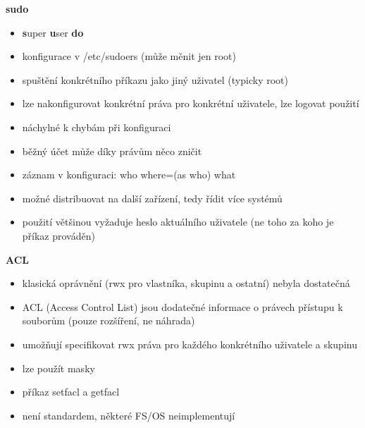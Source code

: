 \textbf{sudo}
\begin{itemize}
	\item \textbf{s}uper \textbf{u}ser \textbf{do}
	\item konfigurace v /etc/sudoers (může měnit jen root)
	\item spuštění konkrétního příkazu jako jiný uživatel (typicky root)
	\item lze nakonfigurovat konkrétní práva pro konkrétní uživatele, lze logovat použití
	\item náchylné k chybám při konfiguraci
	\item běžný účet může díky právům něco zničit
	\item záznam v konfiguraci: who where=(as who) what
	\item možné distribuovat na další zařízení, tedy řídit více systémů
	\item použití většinou vyžaduje heslo aktuálního uživatele (ne toho za koho je příkaz prováděn)
\end{itemize}

\textbf{ACL}
\begin{itemize}
	\item klasická oprávnění (rwx pro vlastníka, skupinu a ostatní) nebyla dostatečná
	\item ACL (Access Control List) jsou dodatečné informace o právech přístupu k souborům (pouze rozšíření, ne náhrada)
	\item umožňují specifikovat rwx práva pro každého konkrétního uživatele a skupinu
	\item lze použít masky
	\item příkaz setfacl a getfacl
	\item není standardem, některé FS/OS neimplementují
\end{itemize}

